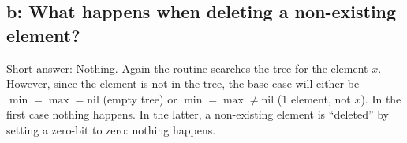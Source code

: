 \documentclass[10pt,oneside,a4paper,final,english]{memoir}
\begin{document}
\subsection{b: What happens when deleting a non-existing element?}
Short answer: Nothing. Again the routine searches the tree for the
element $x$. However, since the element is not in the tree, the base
case will either be $\min = \max = \text{nil}$ (empty tree) or $\min =
\max \neq \text{nil}$ (1 element, not $x$). In the first case nothing
happens. In the latter, a non-existing element is ``deleted'' by
setting a zero-bit to zero: nothing happens.
\end{document}
